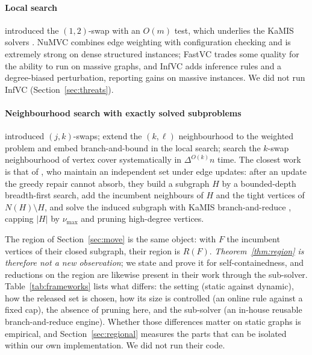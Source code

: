 \documentclass[pdflatex,sn-mathphys-num]{sn-jnl}
\theoremstyle{thmstyleone}%
\theoremstyle{thmstyletwo}%
\begin{document}
\paragraph{Local search} \citet{andrade2012} introduced the $(1,2)$-swap with an
$O(m)$ test, which underlies the KaMIS solvers \citep{lamm2017,dahlum2016}. NuMVC
\citep{cai2013numvc} combines edge weighting with configuration checking and is
extremely strong on dense structured instances; FastVC
\citep{cai2015,cai2017fastvc} trades some quality for the ability to run on massive
graphs, and InfVC \citep{sun2025infvc} adds inference rules and a degree-biased
perturbation, reporting gains on massive instances. We did not run InfVC
(Section~\ref{sec:threats}).

\paragraph{Neighbourhood search with exactly solved subproblems}
\citet{andrade2012} introduced $(j,k)$-swaps; \citet{hashimoto2019} extend the
$(k,\ell)$ neighbourhood to the weighted problem and embed branch-and-bound in the
local search; \citet{katzmann2017} search the $k$-swap neighbourhood of vertex cover
systematically in $\Delta^{O(k)}n$ time. The closest work is that of
\citet{borowitz2025}, who maintain an independent set under edge updates: after an
update the greedy repair cannot absorb, they build a subgraph $H$ by a bounded-depth
breadth-first search, add the incumbent neighbours of $H$ and the tight vertices of
$N(H)\setminus H$, and solve the induced subgraph with KaMIS branch-and-reduce
\citep{lamm2019}, capping $|H|$ by $\nu_{\max}$ and pruning high-degree vertices.

The region of Section~\ref{sec:move} is the same object: with $F$ the incumbent
vertices of their closed subgraph, their region is $R(F)$.
\emph{Theorem~\ref{thm:region} is therefore not a new observation}; we state and
prove it for self-containedness, and reductions on the region are likewise present
in their work through the sub-solver. Table~\ref{tab:frameworks} lists what differs:
the setting (static against dynamic), how the released set is chosen, how its size
is controlled (an online rule against a fixed cap), the absence of pruning here, and
the sub-solver (an in-house reusable branch-and-reduce engine). Whether those
differences matter on static graphs is empirical, and Section~\ref{sec:regional}
measures the parts that can be isolated within our own implementation. We did not
run their code.
\end{document}
